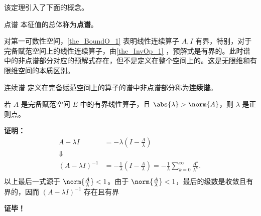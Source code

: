 该定理引入了下面的概念。
\begin{definition}{点谱}
本征值的总体称为\textbf{点谱}。
\end{definition}

对第一可数性空间，\autoref{the_BoundO_1} 表明线性连续算子 $A,I$ 有界，特别，对于完备赋范空间上的线性连续算子，由\autoref{the_InvOp_1} ，预解式是有界的。此时谱中的非点谱部分对应的预解式存在，但不是定义在整个空间上的。这是无限维和有限维空间的本质区别。

\begin{definition}{连续谱}
定义在完备赋范空间上的算子的谱中非点谱部分称为\textbf{连续谱}。
\end{definition}



\begin{theorem}{}
若 $A$ 是完备赋范空间 $E$ 中的有界线性算子，且 $\abs{\lambda}>\norm{A}$，则 $\lambda$ 是正则点。
\end{theorem}

\textbf{证明：} 
\begin{equation}
\begin{aligned}
A-\lambda I&=-\lambda(I-\frac{A}{\lambda})\\
\Downarrow\\
(A-\lambda I)^{-1}&=-\frac{1}{\lambda}(I-\frac{A}{\lambda})=-\frac{1}{\lambda}\sum_{k=0}^\infty\frac{A^k}{\lambda^k}.\\
\end{aligned}~
\end{equation}
以上最后一式源于 $\norm{\frac{A}{\lambda}}<1$。由于 $\norm{\frac{A}{\lambda}}<1$，最后的级数是收敛且有界的，因而 $(A-\lambda I)^{-1}$ 存在且有界


\textbf{证毕！}